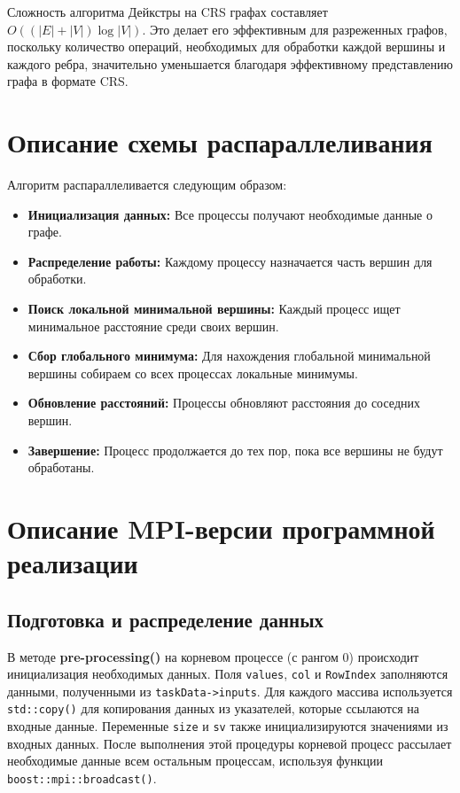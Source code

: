 \documentclass[12pt]{article}
\begin{document}
Сложность алгоритма Дейкстры на CRS графах составляет \( O((|E| + |V|) \log |V|) \). Это делает его эффективным для разреженных графов, поскольку количество операций, необходимых для обработки каждой вершины и каждого ребра, значительно уменьшается благодаря эффективному представлению графа в формате CRS.


\newpage

\section{Описание схемы распараллеливания}

Алгоритм распараллеливается следующим образом:

\begin{itemize}
    \item \textbf{Инициализация данных:} Все процессы получают необходимые данные о графе.
    \item \textbf{Распределение работы:} Каждому процессу назначается часть вершин для обработки.
    \item \textbf{Поиск локальной минимальной вершины:} Каждый процесс ищет минимальное расстояние среди своих вершин.
    \item \textbf{Сбор глобального минимума:} Для нахождения глобальной минимальной вершины собираем со всех процессах локальные минимумы.
    \item \textbf{Обновление расстояний:} Процессы обновляют расстояния до соседних вершин.
    \item \textbf{Завершение:} Процесс продолжается до тех пор, пока все вершины не будут обработаны.
\end{itemize}

\section{Описание MPI-версии программной реализации}

\subsection*{Подготовка и распределение данных}
В методе \textbf{pre-processing()} на корневом процессе (с рангом 0) происходит инициализация необходимых данных. Поля \texttt{values}, \texttt{col} и \texttt{RowIndex} заполняются данными, полученными из \texttt{taskData->inputs}. Для каждого массива используется \texttt{std::copy()} для копирования данных из указателей, которые ссылаются на входные данные. Переменные \texttt{size} и \texttt{sv} также инициализируются значениями из входных данных. После выполнения этой процедуры корневой процесс рассылает необходимые данные всем остальным процессам, используя функции \texttt{boost::mpi::broadcast()}.
\end{document}
